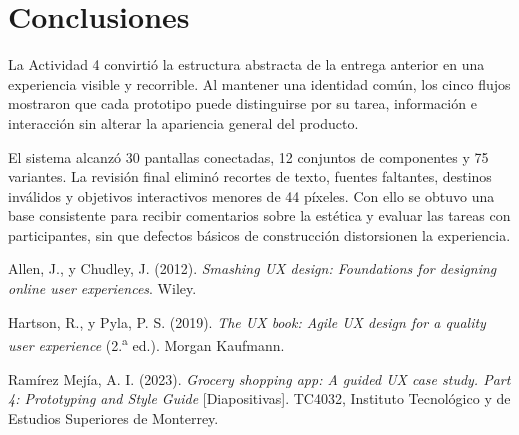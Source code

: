 \section{Conclusiones}

La Actividad 4 convirtió la estructura abstracta de la entrega anterior en una experiencia
visible y recorrible. Al mantener una identidad común, los cinco flujos mostraron que cada
prototipo puede distinguirse por su tarea, información e interacción sin alterar la apariencia
general del producto.

El sistema alcanzó 30 pantallas conectadas, 12 conjuntos de componentes y 75 variantes. La
revisión final eliminó recortes de texto, fuentes faltantes, destinos inválidos y objetivos
interactivos menores de 44 píxeles. Con ello se obtuvo una base consistente para recibir
comentarios sobre la estética y evaluar las tareas con participantes, sin que defectos básicos
de construcción distorsionen la experiencia.


\begin{uxreferencias}
Allen, J., y Chudley, J. (2012). \textit{Smashing UX design: Foundations for designing online
user experiences}. Wiley.

Hartson, R., y Pyla, P. S. (2019). \textit{The UX book: Agile UX design for a quality user
experience} (2.\textsuperscript{a} ed.). Morgan Kaufmann.

Ramírez Mejía, A. I. (2023). \textit{Grocery shopping app: A guided UX case study. Part 4:
Prototyping and Style Guide} [Diapositivas]. TC4032, Instituto Tecnológico y de Estudios
Superiores de Monterrey.
\end{uxreferencias}
